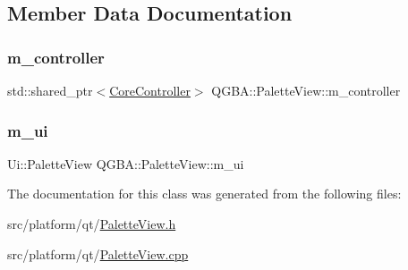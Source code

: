 \subsection{Member Data Documentation}
\mbox{\label{class_q_g_b_a_1_1_palette_view_a7aee62cbec2c6337b920d04f0d9028ba}} 
\subsubsection{\texorpdfstring{m\+\_\+controller}{m\_controller}}
{\footnotesize\ttfamily std\+::shared\+\_\+ptr$<$\mbox{\hyperlink{class_q_g_b_a_1_1_core_controller}{Core\+Controller}}$>$ Q\+G\+B\+A\+::\+Palette\+View\+::m\+\_\+controller\hspace{0.3cm}{\ttfamily [private]}}

\mbox{\label{class_q_g_b_a_1_1_palette_view_a6d688bfb46f8a4fd6fa8cd12b94cab1c}} 
\subsubsection{\texorpdfstring{m\+\_\+ui}{m\_ui}}
{\footnotesize\ttfamily Ui\+::\+Palette\+View Q\+G\+B\+A\+::\+Palette\+View\+::m\+\_\+ui\hspace{0.3cm}{\ttfamily [private]}}



The documentation for this class was generated from the following files\+:\begin{DoxyCompactItemize}
\item 
src/platform/qt/\mbox{\hyperlink{_palette_view_8h}{Palette\+View.\+h}}\item 
src/platform/qt/\mbox{\hyperlink{_palette_view_8cpp}{Palette\+View.\+cpp}}\end{DoxyCompactItemize}
